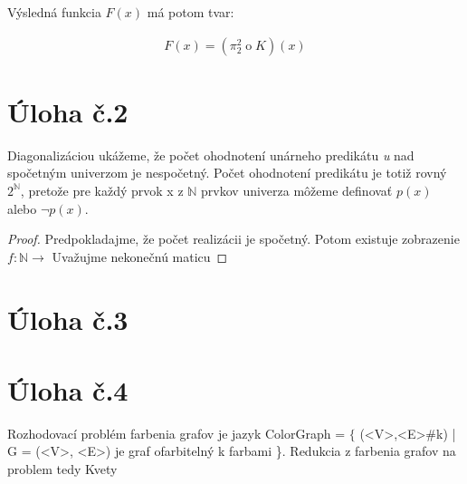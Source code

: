 \documentclass[10pt]{article}
\begin{document}
Výsledná funkcia $F(x)$ má potom tvar:

\begin{align*}
    F(x) = (\pi_2^2 \mathbin{o} K) (x)
\end{align*}

\section*{Úloha č.2}
Diagonalizáciou ukážeme, že počet ohodnotení unárneho predikátu \textit{u} nad spočetným univerzom je nespočetný. Počet ohodnotení predikátu je totiž rovný $2^{\mathbb{N}}$, pretože pre každý prvok x z $\mathbb{N}$ prvkov univerza môžeme definovať $p(x)$ alebo $\neg p(x)$.

\begin{proof}
    Predpokladajme, že počet realizácii je spočetný. Potom existuje zobrazenie $f: \mathbb{N} \to$ 
    Uvažujme nekonečnú maticu
\end{proof}
\section*{Úloha č.3}
\section*{Úloha č.4}
Rozhodovací problém farbenia grafov je jazyk ColorGraph = $\{$ (<V>,<E>\#k) | G = (<V>, <E>) je graf
ofarbitelný k farbami \}.
Redukcia z farbenia grafov na problem tedy Kvety 
\end{document}
